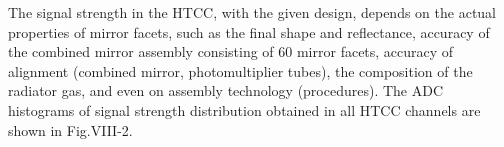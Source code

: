 \indent The signal strength in the HTCC, with the given design, depends on the actual properties of mirror facets, such as the final shape and reflectance, accuracy of the combined mirror assembly consisting of 60 mirror facets, accuracy of alignment (combined mirror, photomultiplier tubes), the composition of the radiator gas, and even on assembly technology (procedures). The ADC histograms of signal strength distribution obtained in all HTCC channels are shown in Fig.VIII-2. 

